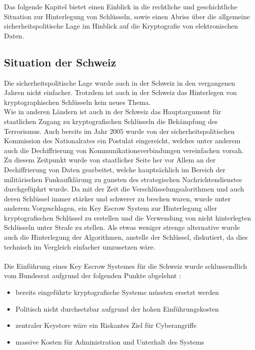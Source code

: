 
Das folgende Kapitel bietet einen Einblick in die rechtliche und geschichtliche Situation zur Hinterlegung von Schlüsseln, sowie einen Abriss über die allgemeine sicherheitspolitische Lage im Hinblick auf die Kryptografie von elektronischen Daten.
	
	
	\subsection{Situation der Schweiz}

Die sicherheitspolitische Lage wurde auch in der Schweiz in den vergangenen Jahren nicht einfacher. Trotzdem ist auch in der Schweiz das Hinterlegen von kryptographischen Schlüsseln kein neues Thema. \\
Wie in anderen Ländern ist auch in der Schweiz das Hauptargument für staatlichen Zugang zu kryptografischen Schlüsseln die Bekämpfung des Terrorismus. Auch bereits im Jahr 2005 wurde von der sicherheitspolitischen Kommission des Nationalrates ein Postulat eingereicht, welches unter anderem auch die Dechiffrierung von Kommunikationsverbindungen vereinfachen vorsah. \cite{null} \\ %
Zu diesem Zeitpunkt wurde von staatlicher Seite her vor Allem an der Dechiffrierung von Daten gearbeitet, welche hauptsächlich im Bereich der militärischen Funkaufklärung zu gunsten des strategischen Nachrichtendienstes durchgefüphrt wurde. Da mit der Zeit die Verschlüsselungsalorithmen und auch deren Schlüssel immer stärker und schwerer zu brechen waren, wurde unter anderem Vorgeschlagen, ein Key Escrow System zur Hinterlegung aller kryptografischen Schlüssel zu erstellen und die Verwendung von nicht hinterlegten Schlüsseln unter Strafe zu stellen. Als etwas weniger strenge alternative wurde auch die Hinterlegung der Algorithmen, anstelle der Schlüssel, diskutiert, da dies technisch im Vergleich einfacher umzusetzen wäre. \cite{null} \\ 
\\ %
Die Einführung eines Key Escrow Systemes für die Schweiz wurde schlussendlich vom Bundesrat aufgrund der folgenden Punkte abgelehnt \cite{null}: %

\begin{itemize}
  \item bereits eingeführte kryptografische Systeme müssten ersetzt werden
  \item Politisch nicht durchsetzbar aufgrund der hohen Einführungskosten
  \item zentraler Keystore wäre ein Riskantes Ziel für Cyberangriffe
  \item massive Kosten für Administration und Unterhalt des Systems
\end{itemize}

